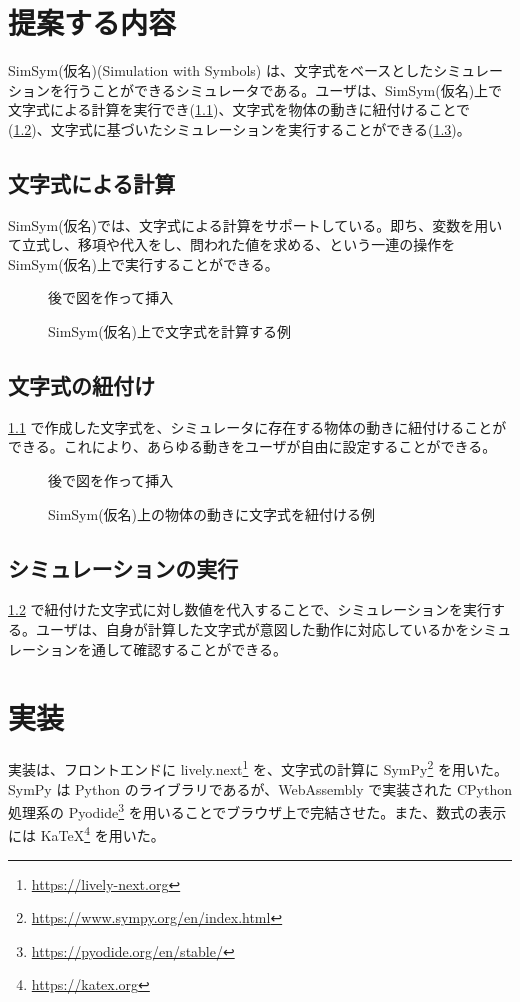 \documentclass[11pt, a4paper, oneside, twocolumn]{jsarticle}
\newcommand{\simname}{SimSym(仮名)}
\newcommand{\simnamealt}{Simulation with Symbols}
\begin{document}
\section{提案する内容}
\simname (\simnamealt) は、文字式をベースとしたシミュレーションを行うことができるシミュレータである。ユーザは、\simname 上で文字式による計算を実行でき(\ref{step1})、文字式を物体の動きに紐付けることで(\ref{step2})、文字式に基づいたシミュレーションを実行することができる(\ref{step3})。

\subsection{文字式による計算} \label{step1}
\simname では、文字式による計算をサポートしている。即ち、変数を用いて立式し、移項や代入をし、問われた値を求める、という一連の操作を \simname 上で実行することができる。

\begin{figure}[h]
\centering
後で図を作って挿入
\caption{\simname 上で文字式を計算する例}
\end{figure}

\subsection{文字式の紐付け} \label{step2}
\ref{step1} で作成した文字式を、シミュレータに存在する物体の動きに紐付けることができる。これにより、あらゆる動きをユーザが自由に設定することができる。

\begin{figure}[h]
\centering
後で図を作って挿入
\caption{\simname 上の物体の動きに文字式を紐付ける例}
\end{figure}

\subsection{シミュレーションの実行} \label{step3}
\ref{step2} で紐付けた文字式に対し数値を代入することで、シミュレーションを実行する。ユーザは、自身が計算した文字式が意図した動作に対応しているかをシミュレーションを通して確認することができる。

\section{実装}
実装は、フロントエンドに lively.next\footnote{\url{https://lively-next.org}} を、文字式の計算に SymPy\footnote{\url{https://www.sympy.org/en/index.html}} を用いた。SymPy は Python のライブラリであるが、WebAssembly で実装された CPython 処理系の Pyodide\footnote{\url{https://pyodide.org/en/stable/}} を用いることでブラウザ上で完結させた。また、数式の表示には KaTeX\footnote{\url{https://katex.org}} を用いた。
\end{document}

